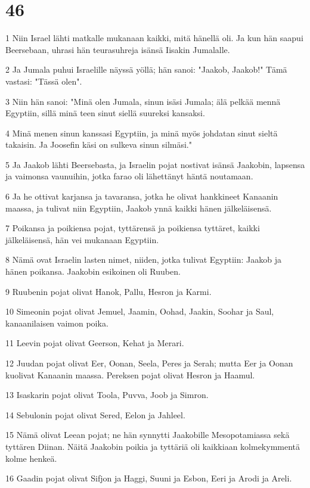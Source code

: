 \chapter{46}

\par 1 Niin Israel lähti matkalle mukanaan kaikki, mitä hänellä oli. Ja kun hän saapui Beersebaan, uhrasi hän teurasuhreja isänsä Iisakin Jumalalle.
\par 2 Ja Jumala puhui Israelille näyssä yöllä; hän sanoi: "Jaakob, Jaakob!" Tämä vastasi: "Tässä olen".
\par 3 Niin hän sanoi: "Minä olen Jumala, sinun isäsi Jumala; älä pelkää mennä Egyptiin, sillä minä teen sinut siellä suureksi kansaksi.
\par 4 Minä menen sinun kanssasi Egyptiin, ja minä myös johdatan sinut sieltä takaisin. Ja Joosefin käsi on sulkeva sinun silmäsi."
\par 5 Ja Jaakob lähti Beersebasta, ja Israelin pojat nostivat isänsä Jaakobin, lapsensa ja vaimonsa vaunuihin, jotka farao oli lähettänyt häntä noutamaan.
\par 6 Ja he ottivat karjansa ja tavaransa, jotka he olivat hankkineet Kanaanin maassa, ja tulivat niin Egyptiin, Jaakob ynnä kaikki hänen jälkeläisensä.
\par 7 Poikansa ja poikiensa pojat, tyttärensä ja poikiensa tyttäret, kaikki jälkeläisensä, hän vei mukanaan Egyptiin.
\par 8 Nämä ovat Israelin lasten nimet, niiden, jotka tulivat Egyptiin: Jaakob ja hänen poikansa. Jaakobin esikoinen oli Ruuben.
\par 9 Ruubenin pojat olivat Hanok, Pallu, Hesron ja Karmi.
\par 10 Simeonin pojat olivat Jemuel, Jaamin, Oohad, Jaakin, Soohar ja Saul, kanaanilaisen vaimon poika.
\par 11 Leevin pojat olivat Geerson, Kehat ja Merari.
\par 12 Juudan pojat olivat Eer, Oonan, Seela, Peres ja Serah; mutta Eer ja Oonan kuolivat Kanaanin maassa. Pereksen pojat olivat Hesron ja Haamul.
\par 13 Isaskarin pojat olivat Toola, Puvva, Joob ja Simron.
\par 14 Sebulonin pojat olivat Sered, Eelon ja Jahleel.
\par 15 Nämä olivat Leean pojat; ne hän synnytti Jaakobille Mesopotamiassa sekä tyttären Diinan. Näitä Jaakobin poikia ja tyttäriä oli kaikkiaan kolmekymmentä kolme henkeä.
\par 16 Gaadin pojat olivat Sifjon ja Haggi, Suuni ja Esbon, Eeri ja Arodi ja Areli.
